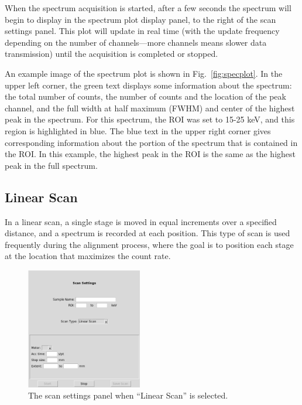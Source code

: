 When the spectrum acquisition is started, after a few seconds the spectrum will
begin to display in the spectrum plot display panel, to the right of the scan
settings panel. This plot will update in real time (with the update frequency
depending on the number of channels---more channels means slower data
transmission) until the acquisition is completed or stopped.

An example image of the spectrum plot is shown in Fig.~\ref{fig:specplot}. In
the upper left corner, the green text displays some information about the
spectrum: the total number of counts, the number of counts and the location of
the peak channel, and the full width at half maximum (FWHM) and center of the
highest peak in the spectrum.  For this spectrum, the ROI was set to 15-25 keV,
and this region is highlighted in blue. The blue text in the upper right corner
gives corresponding information about the portion of the spectrum that is
contained in the ROI. In this example, the highest peak in the ROI is the same
as the highest peak in the full spectrum.

\subsection{Linear Scan}

In a linear scan, a single stage is moved in equal increments over a specified
distance, and a spectrum is recorded at each position. This type of scan is used
frequently during the alignment process, where the goal is to position each
stage at the location that maximizes the count rate.

\begin{figure}
\centering \includegraphics[width=0.45\textwidth]{linscan.png}
\caption{\label{fig:linscan} The scan settings panel when ``Linear Scan'' is
  selected.}
\end{figure}

